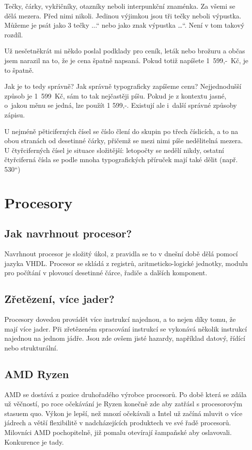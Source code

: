 \documentclass[11pt,a4paper,titlepage]{article}
\providecommand{\czq}[1]{\quotedblbase #1\textquotedblleft}
\begin{document}
Tečky, čárky, vykřičníky, otazníky neboli interpunkční znaménka. 
Za všemi se dělá mezera. Před nimi nikoli.
Jedinou výjimkou jsou tři tečky neboli výpustka. Můžeme je psát jako 3 tečky 
\czq{...} nebo jako znak výpustka \czq{…}. Není v tom takový rozdíl. 
\cite{web:chyby}

Už nesčetněkrát mi někdo poslal podklady pro ceník,
leták nebo brožuru a občas jsem narazil na to, že je cena špatně napsaná.
Pokud totiž napíšete 1~599,-~Kč, je to špatně.

Jak je to tedy správně? Jak správně typograficky
zapíšeme cenu? Nejjednodušší způsob je 1~599~Kč, 
sám to tak nejčastěji píšu. Pokud je z kontextu 
jasné, o~jakou měnu se jedná, lze použít 1 599,-. 
Existují ale i~další správné způsoby zápisu.
\cite{web:zahadna-typografie-3-nejcastejsi-typograficke-chyby}

U nejméně pěticiferných čísel se číslo člení do skupin po třech číslicích,
a to na obou stranách od desetinné čárky, přičemž se mezi nimi píše nedělitelná
mezera. U čtyřciferných čísel je situace složitější: letopočty se nedělí nikdy,
ostatní čtyřciferná čísla se podle mnoha typografických příruček mají také dělit (např. \czq{7 530})
\cite{book:prakticka-typografie}

\section{Procesory}
\subsection{Jak navrhnout procesor?}
Navrhnout procesor je složitý úkol, z pravidla se to v dnešní době
dělá pomocí jazyka VHDL. Procesor se skládá z registrů, aritmeticko-logické jednotky,
modulu pro počítání v plovoucí desetinné čárce, řadiče a dalších komponent. \cite{bc:navrh-procesoru}

\subsection{Zřetězení, více jader?}
Procesory dovedou provádět více instrukcí najednou, a to nejen díky tomu, že mají více jader.
Při zřetězeném spracování instrukcí se vykonává několik instrukcí najednou na jednom jádře.
Jsou zde ovšem jisté hazardy, například datový, řídící nebo strukturální. \cite{bc:navrh-procesoru-CODAL}

\subsection{AMD Ryzen}
AMD se dostává z pozice druhořadého výrobce procesorů. Po době
která se zdála už věčností, po roce očekávání je Ryzen konečně zde
aby zatřásl s procesorovým stasuem quo.
Výkon je lepší, než mnozí očekávali a Intel už začíná mluvit o více jádrech
a větší flexibilitě v nadcházejících produktech ve své řadě procesorů.
Milovníci AMD pochopitelně, již pomalu otevírají šampaňské aby oslavovali.
Konkurence je tady.
\cite{article:amd-ryzen}
\newpage

\end{document}
